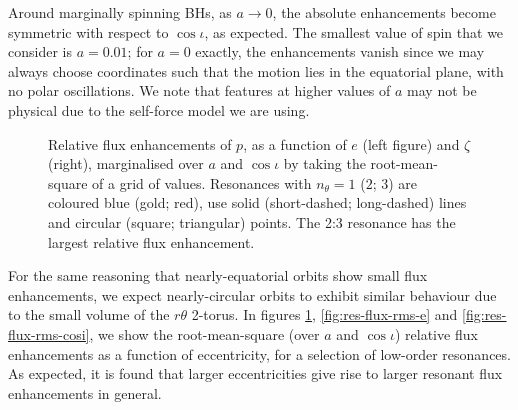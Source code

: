 Around marginally spinning BHs, as $a\rightarrow 0$, the absolute enhancements become symmetric with respect to $\cos\iota$, as expected. The smallest value of spin that we consider is $a=0.01$; for $a=0$ exactly, the enhancements vanish since we may always choose coordinates such that the motion lies in the equatorial plane, with no polar oscillations. We note that features at higher values of $a$ may not be physical due to the self-force model we are using.

\begin{figure}[htbp]
\centering
{}
\caption{\label{fig:res-flux-rms-p}Relative flux enhancements of $p$, as a function of $e$ (left figure) and $\zeta$ (right), marginalised over $a$ and $\cos\iota$ by taking the root-mean-square of a grid of values. Resonances with $n_\theta = 1$ ($2$; $3$) are coloured blue (gold; red), use solid (short-dashed; long-dashed) lines and circular (square; triangular) points. The 2:3 resonance has the largest relative flux enhancement.}
\end{figure}

For the same reasoning that nearly-equatorial orbits show small flux enhancements, we expect nearly-circular orbits to exhibit similar behaviour due to the small volume of the $r\theta$ 2-torus. In figures \ref{fig:res-flux-rms-p}, \ref{fig:res-flux-rms-e} and \ref{fig:res-flux-rms-cosi}, we show the root-mean-square (over $a$ and $\cos\iota$) relative flux enhancements as a function of eccentricity, for a selection of low-order resonances. As expected, it is found that larger eccentricities give rise to larger resonant flux enhancements in general.

